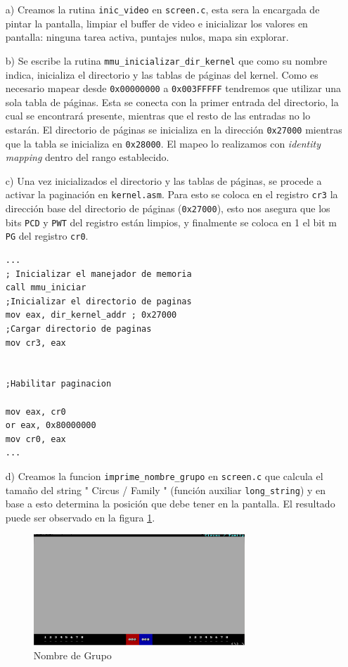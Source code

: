 \begin{enumerate}
\item[a)]Creamos la rutina {\tt inic_video} en {\tt screen.c}, esta sera la encargada de pintar la pantalla, limpiar el buffer de video e inicializar los valores en pantalla: ninguna tarea activa, puntajes nulos, mapa sin explorar.

\item[b)]Se escribe la rutina {\tt mmu_inicializar_dir_kernel} que como su nombre indica, inicializa el directorio y las tablas de páginas del kernel. Como es necesario mapear desde {\tt 0x00000000} a {\tt 0x003FFFFF} tendremos que utilizar una sola tabla de páginas. Esta se conecta con la primer entrada del directorio, la cual se encontrará presente, mientras que el resto de las entradas no lo estarán. El directorio de páginas se inicializa en la dirección {\tt 0x27000} mientras que la tabla se inicializa en {\tt 0x28000}. El mapeo lo realizamos con {\it identity mapping} dentro del rango establecido.

\item[c)]Una vez inicializados el directorio y las tablas de páginas, se procede a activar la paginaci\'on en {\tt kernel.asm}. Para esto se coloca en el registro {\tt cr3} la dirección base del directorio de páginas ({\tt 0x27000}), esto nos asegura que los bits {\tt PCD} y {\tt PWT} del registro están limpios, y finalmente se coloca en 1 el bit m {\tt PG} del registro {\tt cr0}.

\FloatBarrier
\begin{lstlisting}[frame=single]
...
; Inicializar el manejador de memoria
call mmu_iniciar
;Inicializar el directorio de paginas
mov eax, dir_kernel_addr ; 0x27000
;Cargar directorio de paginas
mov cr3, eax


;Habilitar paginacion

mov eax, cr0
or eax, 0x80000000
mov cr0, eax
...
\end{lstlisting}
\FloatBarrier
\item[d)]Creamos la funcion {\tt imprime_nombre_grupo} en {\tt screen.c} que calcula el tamaño del string " Circus / Family " (función auxiliar {\tt long_string}) y en base a esto determina la posición que debe tener en la pantalla. El resultado puede ser observado en la figura \ref{fig:pantalla2}.


\begin{figure}[h]
  \centering
    \includegraphics[width=0.75\textwidth]{imagenes/nombregrupo.png}
  \caption{Nombre de Grupo}
  \label{fig:pantalla2}
\end{figure}	
 \FloatBarrier
\end{enumerate}

